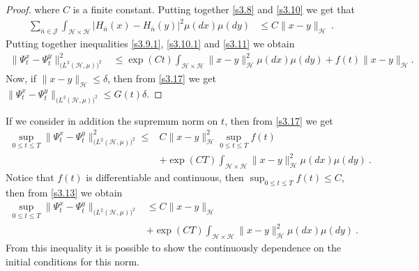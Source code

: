 \documentclass[review,onefignum,onetabnum]{siamart190516}
\begin{document}
\begin{proof}
        where $C$ is a finite constant. Putting together \eqref{s3.8} and
        \eqref{s3.10} we get that
        \begin{align}
            \sum_{\bar n\in \mathcal{J}} \int_{\mathcal{H}\times \mathcal{H}}  
            \big|
            H_{\bar n}(x) -H_{\bar n}(y) \big|^2 \mu(dx)\mu(dy) &\le
            C \| x-y\|_{\mathcal{H}} \ .
            \label{s3.11}
        \end{align}
        Putting together inequalities \eqref{s3.9.1}, \eqref{s3.10.1} and
        \eqref{s3.11} we obtain
        \begin{align}
          \| \Psi_t^x-\Psi_t^y\|_{\big(L^2(\mathcal{H},\mu) \big)^2}^2&\le   
          \exp(Ct)
          \int_{\mathcal{H}\times \mathcal{H}}
          \| x-y\|_{\mathcal{H}}^2 \mu(dx)\mu(dy) +  f(t)\| x-y\|_{\mathcal{H}}.
          \label{s3.17}
        \end{align}
        Now, if $\| x-y\|_{\mathcal{H}}\le \delta $, then from \eqref{s3.17} we 
        get
        $
         \| \Psi_t^x-\Psi_t^y\|_{\big(L^2(\mathcal{H},\mu) \big)^2} \le
          G(t) \delta
        $.
    \end{proof}

\begin{remark}
    If we consider in addition the supremum norm on $t$, then from
    \eqref{s3.17} we get
    \begin{equation}
        \label{s3.13}
        \begin{aligned}
            \sup_{0\le t\le T}\| \Psi_t^x-\Psi_t^y\|_{
                \big(L^2(\mathcal{H},\mu) \big)^2} ^ 2
                \le&
                 C \| x-y\|_{\mathcal{H}}^2
                 \sup_{0\le t\le T} f(t)
                 \\
                 &+
                \exp(CT)
                \int_{\mathcal{H}\times \mathcal{H}}
                \|x-y\|_{\mathcal{H}}^2 \mu(dx)\mu(dy) \ .
        \end{aligned}
    \end{equation}
    Notice that $f(t)$ is differentiable and continuous, then
    $\sup_{0\le t\le T} f(t)\le C$, then from \eqref{s3.13} we obtain
    \begin{equation}
        \label{s3.14}
        \begin{aligned}
            \sup_{0\le t\le T}
            \|
                \Psi_t^x-\Psi_t^y
            \|_{\big(L^2(\mathcal{H},\mu)\big)^2}
            &\le
            C \| x-y\|_{\mathcal{H}}
            \\
            & +
            \exp(CT)
            \int_{\mathcal{H}\times \mathcal{H}}
            \| x-y\|_{\mathcal{H}}^2 \mu(dx)\mu(dy) \ .
        \end{aligned}
    \end{equation}
    From this inequality it is possible to show the continuously dependence on
    the initial conditions for this norm.
\end{remark}
\end{document}
